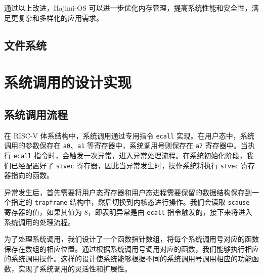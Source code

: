 \documentclass[UTF8]{article}
\begin{document}
通过以上改进，Hajimi-OS 可以进一步优化内存管理，提高系统性能和安全性，满足更复杂和多样化的应用需求。

\subsection{文件系统}

\section{系统调用的设计实现}
\subsection{系统调用流程}
在 RISC-V 体系结构中，系统调用通过专用指令 \texttt{ecall} 实现。在用户态中，系统调用的参数保存在 \texttt{a0}、\texttt{a1} 等寄存器中，系统调用号则保存在 \texttt{a7} 寄存器中。当执行 \texttt{ecall} 指令时，会触发一次异常，进入异常处理流程。在系统初始化阶段，我们已经配置好了 \texttt{stvec} 寄存器，因此当异常发生时，操作系统将执行 \texttt{stvec} 寄存器指向的函数。

异常发生后，首先需要将用户态寄存器和用户态进程需要保留的数据结构保存到一个指定的 \texttt{trapframe} 结构中，然后切换到内核态进行操作。我们会读取 \texttt{scause} 寄存器的值，如果其值为 8，即表明异常是由 \texttt{ecall} 指令触发的，接下来将进入系统调用的处理流程。

为了处理系统调用，我们设计了一个函数指针数组，将每个系统调用号对应的函数保存在数组的相应位置。通过根据系统调用号调用对应的函数，我们能够执行相应的系统调用操作。这样的设计使系统能够根据不同的系统调用号调用相应的功能函数，实现了系统调用的灵活性和扩展性。
\end{document}
